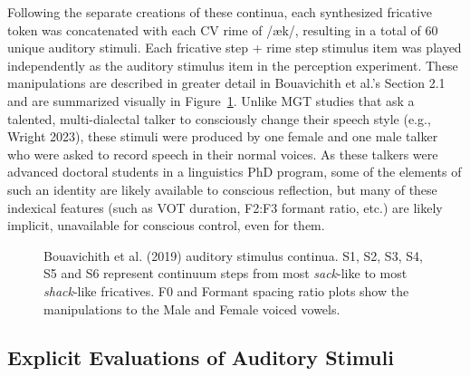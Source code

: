 \documentclass[
  letterpaper,
  DIV=11,
  numbers=noendperiod]{scrartcl}
\begin{document}
Following the separate creations of these continua, each synthesized
fricative token was concatenated with each CV rime of /æk/, resulting in
a total of 60 unique auditory stimuli. Each fricative step + rime step
stimulus item was played independently as the auditory stimulus item in
the perception experiment. These manipulations are described in greater
detail in Bouavichith et al.'s Section 2.1 and are summarized visually
in Figure~\ref{fig-stimuli}. Unlike MGT studies that ask a talented,
multi-dialectal talker to consciously change their speech style (e.g.,
Wright 2023), these stimuli were produced by one female and one male
talker who were asked to record speech in their normal voices. As these
talkers were advanced doctoral students in a linguistics PhD program,
some of the elements of such an identity are likely available to
conscious reflection, but many of these indexical features (such as VOT
duration, F2:F3 formant ratio, etc.) are likely implicit, unavailable
for conscious control, even for them.

\begin{figure}


\caption{\label{fig-stimuli}Bouavichith et al. (2019) auditory stimulus
continua. S1, S2, S3, S4, S5 and S6 represent continuum steps from most
\emph{sack}-like to most \emph{shack}-like fricatives. F0 and Formant
spacing ratio plots show the manipulations to the Male and Female voiced
vowels.}

\end{figure}%

\subsection{Explicit Evaluations of Auditory
Stimuli}\label{sec-stim-evals}
\end{document}
